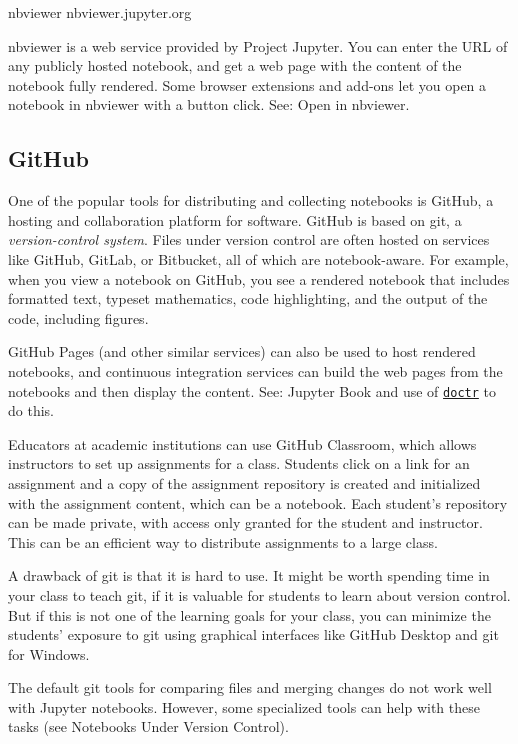 \documentclass[]{book}
\let\BeginKnitrBlock\begin \let\EndKnitrBlock\end
\begin{document}
\BeginKnitrBlock{rmdnote}
nbviewer nbviewer.jupyter.org

nbviewer is a web service provided by Project Jupyter. You can enter the
URL of any publicly hosted notebook, and get a web page with the content
of the notebook fully rendered. Some browser extensions and add-ons let
you open a notebook in nbviewer with a button click. See: Open in
nbviewer.
\EndKnitrBlock{rmdnote}

\subsection{GitHub}\label{github}

One of the popular tools for distributing and collecting notebooks is
GitHub, a hosting and collaboration platform for software. GitHub is
based on git, a \emph{version-control system}. Files under version
control are often hosted on services like GitHub, GitLab, or Bitbucket,
all of which are notebook-aware. For example, when you view a notebook
on GitHub, you see a rendered notebook that includes formatted text,
typeset mathematics, code highlighting, and the output of the code,
including figures.

GitHub Pages (and other similar services) can also be used to host
rendered notebooks, and continuous integration services can build the
web pages from the notebooks and then display the content. See: Jupyter
Book and use of \href{https://drdoctr.github.io/doctr}{\texttt{doctr}}
to do this.

Educators at academic institutions can use GitHub Classroom, which
allows instructors to set up assignments for a class. Students click on
a link for an assignment and a copy of the assignment repository is
created and initialized with the assignment content, which can be a
notebook. Each student's repository can be made private, with access
only granted for the student and instructor. This can be an efficient
way to distribute assignments to a large class.

A drawback of git is that it is hard to use. It might be worth spending
time in your class to teach git, if it is valuable for students to learn
about version control. But if this is not one of the learning goals for
your class, you can minimize the students' exposure to git using
graphical interfaces like GitHub Desktop and git for Windows.

The default git tools for comparing files and merging changes do not
work well with Jupyter notebooks. However, some specialized tools can
help with these tasks (see Notebooks Under Version Control).
\end{document}
